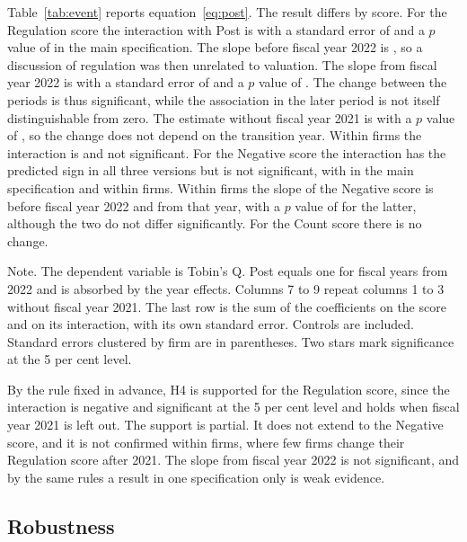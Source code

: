 \documentclass[12pt,a4paper]{article}
\newcommand{\tablenote}[1]{\par\smallskip\begin{minipage}{\linewidth}\footnotesize\setstretch{1.05}#1\end{minipage}}
\newcommand{\widetable}[1]{\resizebox{\ifdim\width>\linewidth\linewidth\else\width\fi}{!}{}}
\begin{document}
Table~\ref{tab:event} reports equation~\eqref{eq:post}. The result differs by score. For the Regulation score the interaction with Post is \coefEReg{} with a standard error of \seEReg{} and a $p$ value of \pvalEReg{} in the main specification. The slope before fiscal year 2022 is \coefPreEReg{}, so a discussion of regulation was then unrelated to valuation. The slope from fiscal year 2022 is \coefSlopeEReg{} with a standard error of \seSlopeEReg{} and a $p$ value of \pvalSlopeEReg{}. The change between the periods is thus significant, while the association in the later period is not itself distinguishable from zero. The estimate without fiscal year 2021 is \coefEDReg{} with a $p$ value of \pvalEDReg{}, so the change does not depend on the transition year. Within firms the interaction is \coefEFReg{} and not significant. For the Negative score the interaction has the predicted sign in all three versions but is not significant, with \coefENeg{} in the main specification and \coefEFNeg{} within firms. Within firms the slope of the Negative score is \coefPreEFNeg{} before fiscal year 2022 and \coefSlopeEFNeg{} from that year, with a $p$ value of \pvalSlopeEFNeg{} for the latter, although the two do not differ significantly. For the Count score there is no change.

\begin{table}[!htbp]
\centering\footnotesize
\caption{Biodiversity scores and Tobin's Q after the Kunming Declaration}\label{tab:event}
\widetable{tables/tab_event}
\tablenote{Note. The dependent variable is Tobin's Q. Post equals one for fiscal years from 2022 and is absorbed by the year effects. Columns 7 to 9 repeat columns 1 to 3 without fiscal year 2021. The last row is the sum of the coefficients on the score and on its interaction, with its own standard error. Controls are included. Standard errors clustered by firm are in parentheses. Two stars mark significance at the 5 per cent level.}
\end{table}

By the rule fixed in advance, H4 is supported for the Regulation score, since the interaction is negative and significant at the 5 per cent level and holds when fiscal year 2021 is left out. The support is partial. It does not extend to the Negative score, and it is not confirmed within firms, where few firms change their Regulation score after 2021. The slope from fiscal year 2022 is not significant, and by the same rules a result in one specification only is weak evidence.

\subsection{Robustness}
\end{document}
